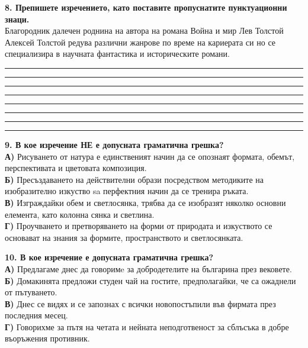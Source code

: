 \documentclass[12pt,a4paper]{article}
\begin{document}
\vspace{0.6cm}

\noindent
\textbf{8. Препишете изречението, като поставите пропуснатите пунктуационни знаци.} \\
Благородник далечен роднина на автора на романа Война и мир Лев Толстой Алексей Толстой редува различни жанрове по време на кариерата си но се специализира в научната фантастика и историческите романи.

\vspace{0.2cm}
\noindent\rule{\linewidth}{0.4pt}
\noindent\rule{\linewidth}{0.4pt}
\noindent\rule{\linewidth}{0.4pt}
\noindent\rule{\linewidth}{0.4pt}
\noindent\rule{\linewidth}{0.4pt}
\noindent\rule{\linewidth}{0.4pt}
\noindent\rule{\linewidth}{0.4pt}
\noindent\rule{\linewidth}{0.4pt}

\vspace{0.6cm}

\noindent
\textbf{9. В кое изречение НЕ е допусната граматична грешка?} \\
\textbf{А)} Рисуването от натура е единственият начин да се опознаят формата, обемът, перспективата и цветовата композиция. \\
\textbf{Б)} Пресъздаването на действителни образи посредством методиките на изобразително изкуство sa перфектния начин да се тренира ръката. \\
\textbf{В)} Изграждайки обем и светлосянка, трябва да се изобразят няколко основни елемента, като колонна сянка и светлина. \\
\textbf{Г)} Проучването и претворяването на форми от природата и изкуството се основават на знания за формите, пространството и светлосянката.

\vspace{0.6cm}

\noindent
\textbf{10. В кое изречение е допусната граматична грешка?} \\
\textbf{А)} Предлагаме днес да говоримe за добродетелите на българина през вековете. \\
\textbf{Б)} Домакинята предложи студен чай на гостите, предполагайки, че са ожаднели от пътуването. \\
\textbf{В)} Днес се видях и се запознах с всички новопостъпили във фирмата през последния месец. \\
\textbf{Г)} Говорихме за пътя на четата и нейната неподготвеност за сблъсъка в добре въоръжения противник.

\vspace{0.6cm}
\end{document}

